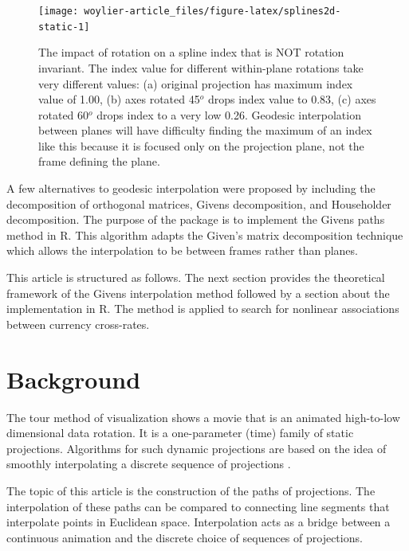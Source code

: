 \begin{Schunk}
\begin{figure}
\texttt{[image: woylier-article\_files/figure-latex/splines2d-static-1]} \caption[The impact of rotation on a spline index that is NOT rotation invariant]{The impact of rotation on a spline index that is NOT rotation invariant. The index value for different within-plane rotations take very different values: (a) original projection has maximum index value of 1.00, (b) axes rotated 45$^o$ drops index value to 0.83, (c) axes rotated 60$^o$ drops index to a very low 0.26. Geodesic interpolation between planes will have difficulty finding the maximum of an index like this because it is focused only on the projection plane, not the frame defining the plane.}\label{fig:splines2d-static}
\end{figure}
\end{Schunk}

A few alternatives to geodesic interpolation were proposed by
\citet{buja_cook_asimov_hurley_2005} including the decomposition of
orthogonal matrices, Givens decomposition, and Householder
decomposition. The purpose of the  package is to
implement the Givens paths method in R. This algorithm adapts the
Given's matrix decomposition technique which allows the interpolation to
be between frames rather than planes.

This article is structured as follows. The next section provides the
theoretical framework of the Givens interpolation method followed by a
section about the implementation in R. The method is applied to search
for nonlinear associations between currency cross-rates.

\hypertarget{background}{%
\section{Background}\label{background}}

The tour method of visualization shows a movie that is an animated
high-to-low dimensional data rotation. It is a one-parameter (time)
family of static projections. Algorithms for such dynamic projections
are based on the idea of smoothly interpolating a discrete sequence of
projections \citep{buja_cook_asimov_hurley_2005}.

The topic of this article is the construction of the paths of
projections. The interpolation of these paths can be compared to
connecting line segments that interpolate points in Euclidean space.
Interpolation acts as a bridge between a continuous animation and the
discrete choice of sequences of projections.

